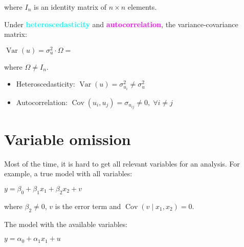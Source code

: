 \documentclass[10pt, a4paper, landscape]{article}
\DeclareMathOperator{\Var}{Var}
\DeclareMathOperator{\Cov}{Cov}
\begin{document}
\begin{multicols}{3}
\quad where \( I_{n} \) is an identity matrix of \( n \times n \) elements.

Under \textcolor{cyan}{\textbf{heteroscedasticity}} and \textcolor{magenta}{\textbf{autocorrelation}}, the variance-covariance matrix:

\begin{center}
	\( \Var(u) = \sigma_{u}^{2} \cdot \Omega = \)
\end{center}

\quad where \( \Omega \neq I_{n} \).

\begin{itemize}[leftmargin=*]
	\item Heteroscedasticity: \( \Var(u) = \sigma_{u_{i}}^{2} \neq \sigma_{u}^{2} \)
	\item Autocorrelation: \( \Cov(u_{i}, u_{j}) = \sigma_{u_{ij}} \neq 0, \; \forall i \neq j \)
\end{itemize}

\section*{Variable omission}

Most of the time, it is hard to get all relevant variables for an analysis. For example, a true model with all variables:

\begin{center}
	\( y = \beta_{0} + \beta_{1} x_{1} + \beta_{2} x_{2} + v \)
\end{center}

\quad where \( \beta_{2} \neq 0 \), \( v \) is the error term and \( \Cov(v \mid x_{1}, x_{2}) = 0 \).

The model with the available variables:

\begin{center}
	\( y = \alpha_{0} + \alpha_{1} x_{1} + u \)
\end{center}


\end{multicols}
\end{document}
